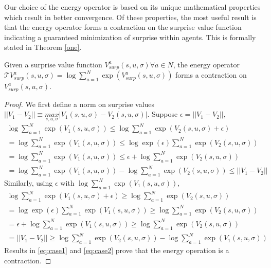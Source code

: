 \documentclass{article}
\begin{document}
\begin{multicols}{2}
Our choice of the energy operator is based on its unique mathematical properties which result in better convergence. Of these properties, the most useful result is that the energy operator forms a contraction on the surprise value function indicating a guaranteed minimization of surprise within agents. This is formally stated in Theorem \autoref{one}. %
\begin{customthm}{1}\label{one}
Given a surprise value function $V^{a}_{surp}(s,u,\sigma) \forall a \in N$, the energy operator $\mathcal{T}V^{a}_{surp}(s,u,\sigma)=\log \sum_{a=1}^{N} \exp{(V^{a}_{surp}(s,u,\sigma))}$ forms a contraction on $V^{a}_{surp}(s,u,\sigma)$. 
\end{customthm}
\begin{proof}
  We first define a norm on surprise values $||V_{1} - V_{2}|| \equiv \underset{s,u,\sigma}{max}|V_{1}(s,u,\sigma) - V_{2}(s,u,\sigma)|$. Suppose $\epsilon = ||V_{1} - V_{2}||$,
  \begin{gather}
      \log \sum_{a=1}^{N}\exp{(V_{1}(s,u,\sigma))} \leq \log \sum_{a=1}^{N}\exp{(V_{2}(s,u,\sigma) + \epsilon)} \nonumber \\
      = \log \sum_{a=1}^{N}\exp{(V_{1}(s,u,\sigma))} \leq \log \exp{(\epsilon)} \sum_{a=1}^{N}\exp{(V_{2}(s,u,\sigma))} \nonumber \\
      = \log \sum_{a=1}^{N}\exp{(V_{1}(s,u,\sigma))} \leq \epsilon + \log \sum_{a=1}^{N} \exp{(V_{2}(s,u,\sigma))} \nonumber \\
      = \log \sum_{a=1}^{N} \exp{(V_{1}(s,u,\sigma))} - \log \sum_{a=1}^{N} \exp{(V_{2}(s,u,\sigma))} \leq ||V_{1} - V_{2}|| \label{eq:case1}
  \end{gather}
  Similarly, using $\epsilon$ with $\log \sum_{a=1}^{N} \exp{(V_{1}(s,u,\sigma))}$,
  \begin{gather}
      \log \sum_{a=1}^{N}\exp{(V_{1}(s,u,\sigma) + \epsilon)} \geq \log \sum_{a=1}^{N}\exp{(V_{2}(s,u,\sigma))} \nonumber \\
      = \log \exp{(\epsilon)}\sum_{a=1}^{N}\exp{(V_{1}(s,u,\sigma))} \geq \log \sum_{a=1}^{N}\exp{(V_{2}(s,u,\sigma))} \nonumber \\
      = \epsilon + \log \sum_{a=1}^{N} \exp{(V_{1}(s,u,\sigma))} \geq \log \sum_{a=1}^{N}\exp{(V_{2}(s,u,\sigma))} \nonumber \\
      = ||V_{1} - V_{2}|| \geq \log \sum_{a=1}^{N} \exp{(V_{2}(s,u,\sigma))} - \log \sum_{a=1}^{N} \exp{(V_{1}(s,u,\sigma))} \label{eq:case2}
  \end{gather}
  Results in \autoref{eq:case1} and \autoref{eq:case2} prove that the energy operation is a contraction. 

\end{proof}
\end{multicols}
\end{document}
